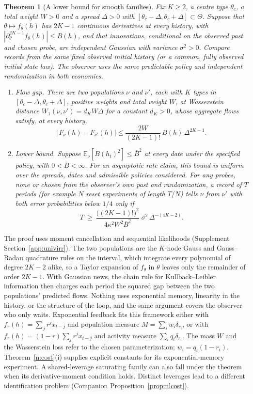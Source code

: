 \documentclass[12pt]{article}
\newtheorem{theorem}{Theorem}[section]
\theoremstyle{definition}
\theoremstyle{remark}
\begin{document}
\begin{theorem}[A lower bound for smooth families]\label{n:univ}
Fix $K\ge2$, a centre type $\theta_c$, a total weight $W>0$ and a spread $\Delta>0$ with $[\theta_c-\Delta,\theta_c+\Delta]\subset\Theta$. Suppose that $\theta\mapsto f_\theta(h)$ has $2K-1$ continuous derivatives at every history, with $|\partial_\theta^{2K-1}f_\theta(h)|\le B(h)$, and that innovations, conditional on the observed past and chosen probe, are independent Gaussian with variance $\sigma^2>0$. Compare records from the same fixed observed initial history (or a common, fully observed initial state law). The observer uses the same predictable policy and independent randomization in both economies.
\begin{enumerate}[label=(\roman*),itemsep=1pt]
\item \emph{Flow gap.} There are two populations $\nu$ and $\nu'$, each with $K$ types in $[\theta_c-\Delta,\theta_c+\Delta]$, positive weights and total weight $W$, at Wasserstein distance $W_1(\nu,\nu')=d_KW\Delta$ for a constant $d_K>0$, whose aggregate flows satisfy, at every history,
\[
|F_\nu(h)-F_{\nu'}(h)|\le\frac{2W}{(2K-1)!}\,B(h)\,\Delta^{2K-1}.
\]
\item \emph{Lower bound.} Suppose $\mathbb E_\nu[B(h_t)^2]\le\bar B^2$ at every date under the specified policy, with $0<\bar B<\infty$. For an asymptotic rate claim, this bound is uniform over the spreads, dates and admissible policies considered. For any probes, none or chosen from the observer's own past and randomization, a record of $T$ periods (for example $N$ reset experiments of length $T/N$) tells $\nu$ from $\nu'$ with both error probabilities below $1/4$ only if
\[
T\ \ge\ \frac{\big((2K-1)!\big)^2}{4\kappa^2W^2\bar B^2}\;\sigma^2\,\Delta^{-(4K-2)}.
\]
\end{enumerate}
\end{theorem}

The proof uses moment cancellation and sequential likelihoods (Supplement Section~\ref{app:univirr}). The two populations are the $K$-node Gauss and Gauss--Radau quadrature rules on the interval, which integrate every polynomial of degree $2K-2$ alike, so a Taylor expansion of $f_\theta$ in $\theta$ leaves only the remainder of order $2K-1$. With Gaussian news, the chain rule for Kullback--Leibler information then charges each period the squared gap between the two populations' predicted flows. Nothing uses exponential memory, linearity in the history, or the structure of the loop, and the same argument covers the observer who only waits. Exponential feedback fits this framework either with $f_r(h)=\sum_jr^jx_{t-j}$ and population measure $M=\sum_iw_i\delta_{r_i}$, or with $f_r(h)=(1-r)\sum_jr^jx_{t-j}$ and activity measure $\sum_iq_i\delta_{r_i}$. The mass $W$ and the Wasserstein loss refer to the chosen parameterization; $w_i=q_i(1-r_i)$. Theorem~\ref{n:cost}(i) supplies explicit constants for its exponential-memory experiment. A shared-leverage saturating family can also fall under the theorem when its derivative-moment condition holds. Distinct leverages lead to a different identification problem (Companion Proposition~\ref{prop:nlcost}).
\end{document}
